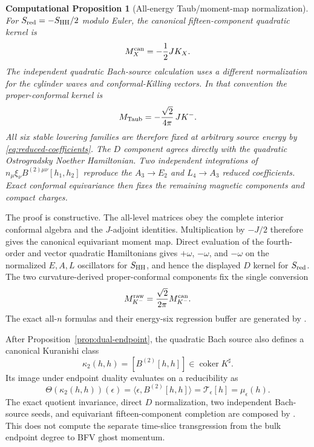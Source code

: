 \documentclass[11pt]{article}
\newtheorem{cproposition}[theorem]{Computational Proposition}
\theoremstyle{definition}
\theoremstyle{remark}
\begin{document}
\begin{cproposition}[All-energy Taub/moment-map normalization]
\label{prop:all-energy-Taub}
For $S_{\rm red}=-S_{\rm HH}/2$ modulo Euler, the canonical
fifteen-component quadratic kernel is
\begin{equation}
 M_X^{\rm can}=-\frac12 J K_X.
\end{equation}
The independent quadratic Bach-source calculation uses a different
normalization for the cylinder waves and conformal-Killing vectors.  In that
convention the proper-conformal kernel is
\begin{equation}\label{eq:taub-normalization}
 M_{\rm Taub}=-\frac{\sqrt2}{4\pi}\,J K^-.
\end{equation}
All six stable lowering families are therefore fixed at arbitrary source
energy by \eqref{eq:reduced-coefficients}.  The $D$ component agrees
directly with the quadratic Ostrogradsky Noether Hamiltonian.  Two
independent integrations of
$n_\mu\xi_\nu B^{(2)\mu\nu}[h_1,h_2]$ reproduce the $A_3\to E_2$ and
$L_4\to A_3$ reduced coefficients.  Exact conformal equivariance then fixes
the remaining magnetic components and compact charges.
\end{cproposition}

The proof is constructive.  The all-level matrices obey the complete
interior conformal algebra and the $J$-adjoint identities.  Multiplication
by $-J/2$ therefore gives the canonical equivariant moment map.  Direct
evaluation of the fourth-order and vector quadratic Hamiltonians gives
$+\omega$, $-\omega$, and $-\omega$ on the normalized $E,A,L$ oscillators
for $S_{\rm HH}$, and hence the displayed $D$ kernel for $S_{\rm red}$.
The two curvature-derived proper-conformal components fix the single
conversion
\begin{equation}
 M_{K^-}^{\rm raw}=\frac{\sqrt2}{2\pi}M_{K^-}^{\rm can}.
\end{equation}
The exact all-$n$ formulas and their energy-six regression buffer are
generated by
.

After Proposition~\ref{prop:dual-endpoint}, the quadratic Bach source also
defines a canonical Kuranishi class
\begin{equation}
 \kappa_2(h,h)=[B^{(2)}[h,h]]\in\operatorname{coker}K^\sharp.
\end{equation}
Its image under endpoint duality evaluates on a reducibility as
\begin{equation}\label{eq:endpoint-Taub-map}
 \Theta(\kappa_2(h,h))(\epsilon)
 =\langle\epsilon,B^{(2)}[h,h]\rangle
 =\mathcal T_\epsilon[h]=\mu_\epsilon(h).
\end{equation}
The exact quotient invariance, direct $D$ normalization, two independent
Bach-source seeds, and equivariant fifteen-component completion are composed
by .  This does not
compute the separate time-slice transgression from the bulk endpoint degree
to BFV ghost momentum.
\end{document}
